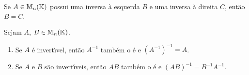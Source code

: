 \begin{proposicao}
Se $A \in \mathbb{M}_{n}(\mathbb{K})$ possui uma inversa \`a esquerda $B$ e uma inversa \`a direita $C$, ent\~ao $B = C$.
\end{proposicao}

\begin{proposicao}
Sejam $A$, $B \in \mathbb{M}_{n}(\mathbb{K})$.
\begin{enumerate}[label={\roman*})]
	\item Se $A$ \'e invert{\'\i}vel, ent\~ao $A^{-1}$ tamb\'em o \'e e $(A^{-1})^{-1} = A$.
	\item Se $A$ e $B$ s\~ao invert{\'\i}veis, ent\~ao $AB$ tamb\'em o \'e e $(AB)^{-1} = B^{-1}A^{-1}$.
\end{enumerate}
\end{proposicao}

